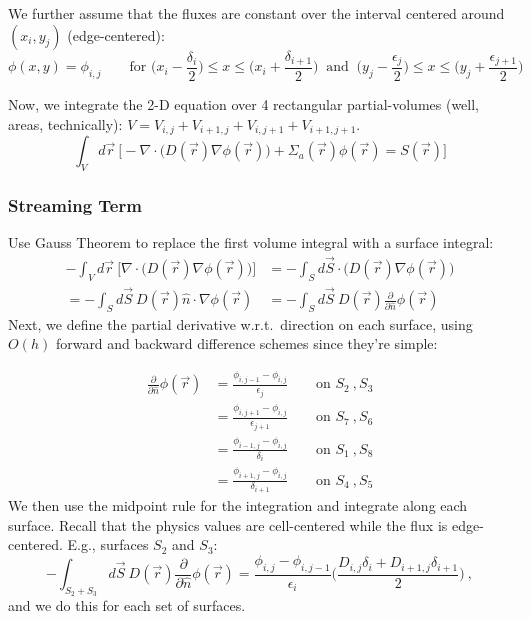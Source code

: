 \documentclass[12pt]{article}
\begin{document}
We further assume that the fluxes are constant over the interval centered around $(x_i, y_j)$ (edge-centered):
%
\[\phi(x,y) = \phi_{i,j} \qquad \text{for } \bigl(x_i - \frac{\delta_i}{2}\bigr) \leq x \leq \bigl(x_i + \frac{\delta_{i+1}}{2}\bigr) \:\text{ and }\:\bigl(y_j - \frac{\epsilon_j}{2}\bigr) \leq x \leq \bigl(y_j + \frac{\epsilon_{j+1}}{2}\bigr) \]

Now, we integrate the 2-D equation over 4 rectangular partial-volumes (well, areas, technically): $V = V_{i,j} + V_{i+1,j} + V_{i,j+1} + V_{i+1,j+1}$.
%
\[\int_V d\vec{r}\:\bigl[-\nabla \cdot \bigl(D(\vec{r})\nabla \phi(\vec{r})\bigr) +\Sigma_a(\vec{r}) \phi(\vec{r}) = S(\vec{r}) \bigr]\]


\subsubsection{Streaming Term}
Use Gauss Theorem to replace the first volume integral with a surface integral:
%
\begin{align}
-\int_V d\vec{r}\:\bigl[\nabla \cdot \bigl(D(\vec{r})\nabla \phi(\vec{r})\bigr)\bigr] &= -\int_S d\vec{S} \cdot\bigl(D(\vec{r})\nabla \phi(\vec{r})\bigr) \nonumber \\
%
= -\int_S d\vec{S}\: D(\vec{r})\hat{n} \cdot \nabla \phi(\vec{r}) &= -\int_S d\vec{S} \:D(\vec{r})\frac{\partial}{\partial \hat{n}}\phi(\vec{r}) \nonumber
\end{align}
%
Next, we define the partial derivative w.r.t.\ direction on each surface, using $O(h)$ forward and backward difference schemes since they're simple:

\begin{align}
\frac{\partial}{\partial \hat{n}}\phi(\vec{r}) &= \frac{\phi_{i,j-1} - \phi_{i,j}}{\epsilon_j} \qquad \text{on } S_2 \:, S_3 \nonumber \\
%
&= \frac{\phi_{i,j+1} - \phi_{i,j}}{\epsilon_{j+1}} \qquad \text{on } S_7 \:, S_6 \nonumber \\
%
&= \frac{\phi_{i-1,j} - \phi_{i,j}}{\delta_{i}} \qquad \text{on } S_1 \:, S_8 \nonumber \\
%
&= \frac{\phi_{i+1,j} - \phi_{i,j}}{\delta_{i+1}} \qquad \text{on } S_4 \:, S_5 \nonumber 
\end{align}
%
We then use the midpoint rule for the integration and integrate along each surface. Recall that the physics values are cell-centered while the flux is edge-centered. E.g., surfaces $S_2$ and $S_3$:
%
\[-\int_{S_2+S_3} d\vec{S} \:D(\vec{r})\frac{\partial}{\partial \hat{n}}\phi(\vec{r}) = \boxed{\frac{\phi_{i,j} - \phi_{i,j-1}}{\epsilon_{i}} \biggl(\frac{D_{i,j} \delta_{i} + D_{i+1,j} \delta_{i+1}}{2}\biggr)}\:,\]
%
and we do this for each set of surfaces. 
\end{document}
